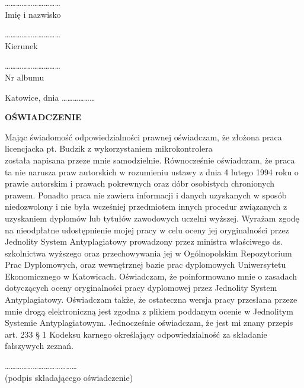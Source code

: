 \newpage

\begin{minipage}[t]{0.5\textwidth}
\begin{flushleft}
\ldots\ldots\ldots\ldots\ldots\ldots\ldots\ldots\ldots\ldots{} \\
Imię i nazwisko

\ldots\ldots\ldots\ldots\ldots\ldots\ldots\ldots\ldots\ldots{} \\
Kierunek

\ldots\ldots\ldots\ldots\ldots\ldots\ldots\ldots\ldots\ldots{} \\
Nr albumu
\end{flushleft}
\end{minipage}
\hfill
\begin{minipage}[t]{0.5\textwidth}
 \begin{flushright}
Katowice, dnia \ldots\ldots\ldots\ldots\ldots\ldots{} 
 \end{flushright}
\end{minipage}

\begin{center}
    \textbf{OŚWIADCZENIE}
\end{center}

\par \noindent Mając świadomość odpowiedzialności prawnej oświadczam, że złożona praca licencjacka pt. Budzik z wykorzystaniem mikrokontrolera\\
została napisana przeze mnie samodzielnie.
Równocześnie oświadczam, że praca ta nie narusza praw autorskich w rozumieniu ustawy z dnia 4 lutego 1994 roku o prawie autorskim i prawach pokrewnych oraz dóbr osobistych chronionych prawem.
Ponadto praca nie zawiera informacji i danych uzyskanych w sposób niedozwolony i nie była wcześniej przedmiotem innych procedur związanych z uzyskaniem dyplomów lub tytułów zawodowych uczelni wyższej.
Wyrażam zgodę na nieodpłatne udostępnienie mojej pracy w celu oceny jej oryginalności przez Jednolity System Antyplagiatowy prowadzony przez ministra właściwego ds. szkolnictwa wyższego oraz przechowywania jej w Ogólnopolskim Repozytorium Prac Dyplomowych, oraz wewnętrznej bazie prac dyplomowych Uniwersytetu Ekonomicznego w Katowicach. Oświadczam, że poinformowano mnie o zasadach dotyczących oceny oryginalności pracy dyplomowej przez Jednolity System Antyplagiatowy.
Oświadczam także, że ostateczna wersja pracy przesłana przeze mnie drogą elektroniczną jest zgodna z plikiem poddanym ocenie w Jednolitym Systemie Antyplagiatowym.
Jednocześnie oświadczam, że jest mi znany przepis art. 233 § 1 Kodeksu karnego określający odpowiedzialność za składanie fałszywych zeznań.

\begin{flushright}
\ldots\ldots\ldots\ldots\ldots\ldots\ldots\ldots\ldots\ldots\ldots\ldots\ldots{} \\
(podpis składającego oświadczenie)
\end{flushright}


\tableofcontents


